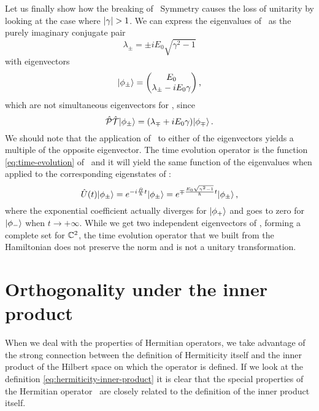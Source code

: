         Let us finally show how the breaking of \PT\ Symmetry causes the loss of unitarity by looking at the case where $\abs{\gamma} > 1$. We can express the eigenvalues of \hH\ as the purely imaginary conjugate pair
        \begin{equation*}
            \lambda_\pm = \pm i E_0 \sqrt{\gamma^2 - 1}
        \end{equation*}
        with eigenvectors
        \begin{equation*}
            \ket{\phi_\pm} = \pmqty{E_0 \\ \lambda_\pm - i E_0 \gamma }
            \mycomma
        \end{equation*}
        which are not simultaneous eigenvectors for \hPT, since
        \begin{equation*}
            \hPT\!\ket{\phi_\pm} = \pqty{\lambda_\mp + i E_0 \gamma}\!\ket{\phi_\mp}
            \myperiod
        \end{equation*}
        We should note that the application of \hPT\ to either of the eigenvectors yields a multiple of the opposite eigenvector. The time evolution operator is the function \eqref{eq:time-evolution} of \hH\ and it will yield the same function of the eigenvalues when applied to the corresponding eigenstates of \hH :
        \begin{equation*}
            \hU\pqty{t}\!\ket{\phi_\pm}
            = \myexp{-i\frac{\hH}{\hbar}t}\!\ket{\phi_\pm}
            = \myexp{\mp\frac{E_0\sqrt{\gamma^2-1}}{\hbar}t}\!\ket{\phi_\pm}
            \mycomma
        \end{equation*}
        where the exponential coefficient actually diverges for $\ket{\phi_+}$ and goes to zero for $\ket{\phi_-}$ when $t\to +\infty$. While we get two independent eigenvectors of \hH, forming a complete set for $\mathbb{C}^2$, the time evolution operator that we built from the Hamiltonian does not preserve the norm and is not a unitary transformation.

        

    \section{Orthogonality under the \texorpdfstring{\PT}{PT} inner product}\label{s:orthogonality}
        When we deal with the properties of Hermitian operators, we take advantage of the strong connection between the definition of Hermiticity itself and the inner product of the Hilbert space on which the operator is defined. If we look at the definition \eqref{eq:hermiticity-inner-product} it is clear that the special properties of the Hermitian operator \hA\ are closely related to the definition of the inner product itself.
        
